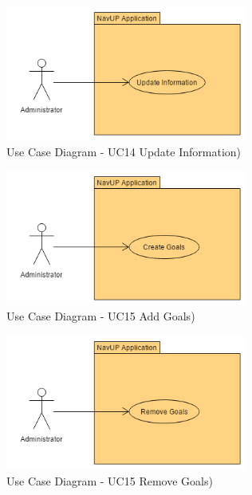 \graphicspath{ {./Images/Administrator/} }
		\begin{figure}[h]
		\caption{Use Case Diagram - UC14  Update Information)}
		\includegraphics[width = 300px]{UpdateInfo.png}
		\end{figure}

	\graphicspath{ {./Images/Administrator/} }
		\begin{figure}[h]
		\caption{Use Case Diagram - UC15 Add Goals)}
		\includegraphics[width = 300px]{AddGoals.png}
		\end{figure}
		
		\graphicspath{ {./Images/Administrator/} }
		\begin{figure}[h]
		\caption{Use Case Diagram - UC15  Remove Goals)}
		\includegraphics[width = 300px]{RemoveGoals.png}
		\end{figure}
